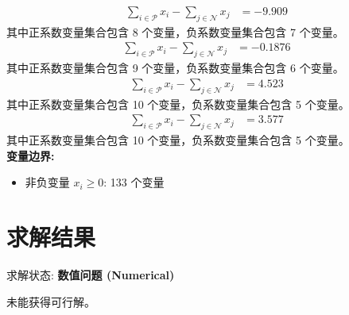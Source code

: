\documentclass[a4paper,11pt]{article}
\begin{document}
\begin{align}
\sum_{i \in \mathcal{P}} x_i - \sum_{j \in \mathcal{N}} x_j &= -9.909 \nonumber
\end{align}
其中正系数变量集合包含 8 个变量，负系数变量集合包含 7 个变量。\\[0.3em]

\begin{align}
\sum_{i \in \mathcal{P}} x_i - \sum_{j \in \mathcal{N}} x_j &= -0.1876 \nonumber
\end{align}
其中正系数变量集合包含 9 个变量，负系数变量集合包含 6 个变量。\\[0.3em]

\begin{align}
\sum_{i \in \mathcal{P}} x_i - \sum_{j \in \mathcal{N}} x_j &= 4.523 \nonumber
\end{align}
其中正系数变量集合包含 10 个变量，负系数变量集合包含 5 个变量。\\[0.3em]

\begin{align}
\sum_{i \in \mathcal{P}} x_i - \sum_{j \in \mathcal{N}} x_j &= 3.577 \nonumber
\end{align}
其中正系数变量集合包含 10 个变量，负系数变量集合包含 5 个变量。\\[0.3em]

\textbf{变量边界:}
\begin{itemize}
\item 非负变量 $x_i \geq 0$: 133 个变量
\end{itemize}

\section{求解结果}

求解状态: \textbf{数值问题 (Numerical)}

未能获得可行解。
\end{document}
